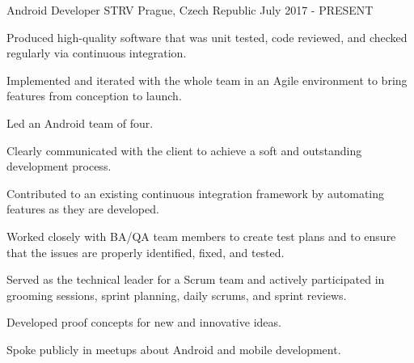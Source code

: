 

\begin{cventries}

  \cventry
    {Android Developer}
    {STRV}
    {Prague, Czech Republic}
    {July 2017 - PRESENT}
    {
      \begin{cvitems}
        \item {Produced high-quality software that was unit tested, code reviewed, and checked regularly via continuous integration.}
        \item {Implemented and iterated with the whole team in an Agile environment to bring features from conception to launch.}
        \item {Led an Android team of four.}
        \item {Clearly communicated with the client to achieve a soft and outstanding development process.}
        \item {Contributed to an existing continuous integration framework by automating features as they are developed.}
        \item {Worked closely with BA/QA team members to create test plans and to ensure that the issues are properly identified, fixed, and tested.}
        \item {Served as the technical leader for a Scrum team and actively participated in grooming sessions, sprint planning, daily scrums, and sprint reviews.}
        \item {Developed proof concepts for new and innovative ideas.}
        \item {Spoke publicly in meetups about Android and mobile development.}
      \end{cvitems}
      \begin{cvsubentries}
      \end{cvsubentries}
}
\end{cventries}

